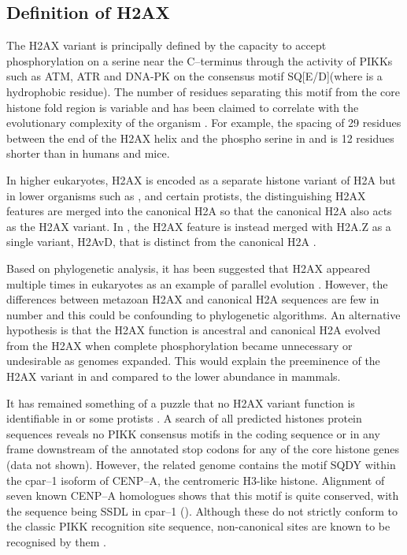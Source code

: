 \subsection{Definition of H2AX}
\label{subsec:h2ax-review:relation-H2A-H2AX}
The H2AX variant is principally defined by the capacity to accept
phosphorylation on a serine near the C--terminus through the activity
of PIKKs such as ATM, ATR and DNA-PK on the consensus motif
SQ[E/D]\textPhi (where \textPhi is a hydrophobic residue). The number
of residues separating this motif from the core histone fold region is
variable and has been claimed to correlate with the evolutionary
complexity of the organism \citep{CRDP+02}. For example, the spacing
of 29 residues between the end of the H2AX  helix and the
phospho serine in  and
 is 12 residues shorter than in humans and
mice.

In higher eukaryotes, H2AX is encoded as a separate histone variant of
H2A but in lower organisms such as ,
 and certain protists, the distinguishing H2AX
features are merged into the canonical H2A \citep{HSM03,SJN06} so that
the canonical H2A also acts as the H2AX variant. In
, the H2AX feature is instead merged
with H2A.Z as a single variant, H2AvD, that is distinct from the
canonical H2A \citep{MCG02}.

Based on phylogenetic analysis, it has been suggested that H2AX
appeared multiple times in eukaryotes as an example of parallel
evolution \citep{HSM03}. However, the differences between metazoan
H2AX and canonical H2A sequences are few in number and this could be
confounding to phylogenetic algorithms. An alternative hypothesis is
that the H2AX function is ancestral and canonical H2A evolved from the
H2AX when complete phosphorylation became unnecessary or undesirable
as genomes expanded. This would explain the preeminence of the H2AX
variant in  and  compared
to the lower abundance in mammals.

It has remained something of a puzzle that no H2AX variant function is
identifiable in  \citep{HSM03} or some
protists \citep{SJN06}. A search of all predicted
 histones protein sequences reveals no PIKK
consensus motifs in the coding sequence or in any frame downstream of
the annotated stop codons for any of the core histone genes (data not
shown). However, the related  genome contains
the motif SQDY within the \mbox{cpar--1} isoform of \mbox{CENP--A},
the centromeric \mbox{H3-like} histone. Alignment of seven known
 \mbox{CENP--A} homologues shows that this
motif is quite conserved, with the sequence being SSDL in
 \mbox{cpar--1}
(). Although these do not strictly
conform to the classic PIKK recognition site sequence, non-canonical
sites are known to be recognised by them \citep{SYC+05}.

